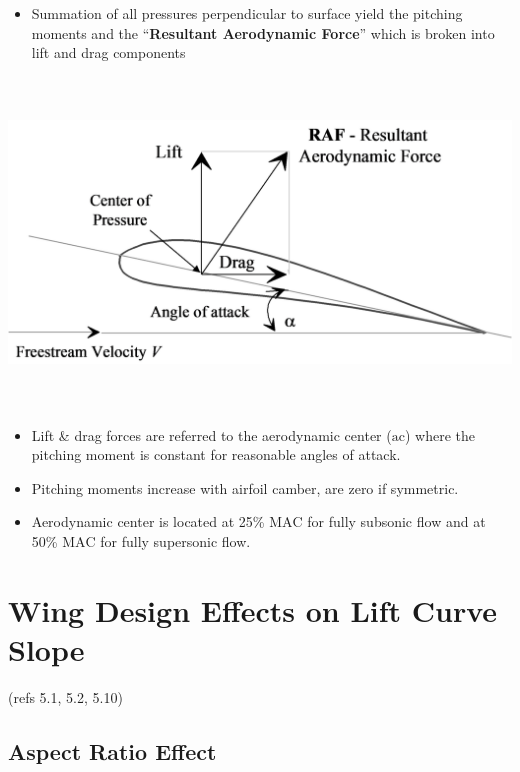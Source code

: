 \documentclass[
]{book}
\providecommand{\tightlist}{%
  \setlength{\itemsep}{0pt}\setlength{\parskip}{0pt}}
\begin{document}
\begin{itemize}
\tightlist
\item
  Summation of all pressures perpendicular to surface yield the pitching moments and the ``\textbf{Resultant Aerodynamic Force}'' which is broken into lift and drag components
\end{itemize}

\includegraphics[width=7.1in,height=3.44in]{media/05/image12.svg}

\begin{itemize}
\tightlist
\item
  Lift \& drag forces are referred to the aerodynamic center (\(\mathrm{ac}\)) where the pitching moment is constant for reasonable angles of attack.
\item
  Pitching moments increase with airfoil camber, are zero if symmetric.
\item
  Aerodynamic center is located at 25\% \(\mathrm{MAC}\) for fully subsonic flow and at 50\% \(\mathrm{MAC}\) for fully supersonic flow.
\end{itemize}

\hypertarget{wing-design-effects-on-lift-curve-slope}{%
\section{Wing Design Effects on Lift Curve Slope}\label{wing-design-effects-on-lift-curve-slope}}

(refs 5.1, 5.2, 5.10)

\hypertarget{aspect-ratio-effect}{%
\subsection*{Aspect Ratio Effect}\label{aspect-ratio-effect}}
\end{document}
